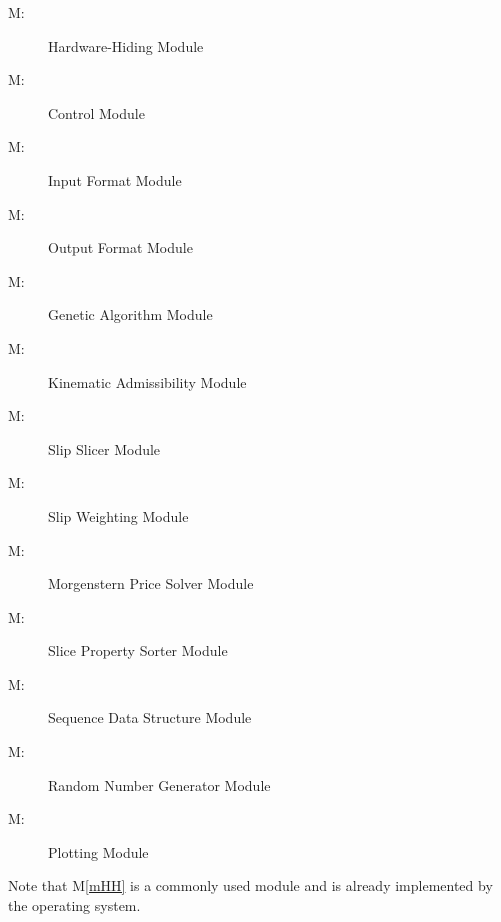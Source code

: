 \documentclass[12pt, titlepage]{article}
\newcounter{mnum}
\newcommand{\mthemnum}{M\themnum}
\newcommand{\mref}[1]{M\ref{#1}}
\begin{document}
\begin{description}
\item [ \mthemnum \label{mHH}:] Hardware-Hiding
  Module
\item [ \mthemnum \label{mControl}:] Control
  Module
\item [ \mthemnum \label{mInput}:] Input Format
  Module
\item [ \mthemnum \label{mOutput}:] Output Format
  Module
\item [ \mthemnum \label{mGenAlg}:] Genetic
  Algorithm Module
\item [ \mthemnum \label{mKinAdm}:] Kinematic
  Admissibility Module
\item [ \mthemnum \label{mSlipSlicer}:] Slip
  Slicer Module
\item [ \mthemnum \label{mSlipWeight}:] Slip
  Weighting Module
\item [ \mthemnum \label{mMorgPrice}:]
  Morgenstern Price Solver Module
\item [ \mthemnum \label{mSliceProperty}:] Slice
  Property Sorter Module
\item [ \mthemnum \label{mArrayOps}:] Sequence
  Data Structure Module
\item [ \mthemnum \label{mRandNum}:] Random
  Number Generator Module
\item [ \mthemnum \label{mPlot}:] Plotting
  Module
\end{description}

Note that \mref{mHH} is a commonly used module and is already
implemented by the operating system.
\end{document}
